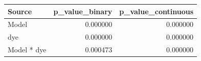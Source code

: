 \begin{tabular}{lrr}
\toprule
Source & p_value_binary & p_value_continuous \\
\midrule
Model & 0.000000 & 0.000000 \\
dye & 0.000000 & 0.000000 \\
Model * dye & 0.000473 & 0.000000 \\
\bottomrule
\end{tabular}
